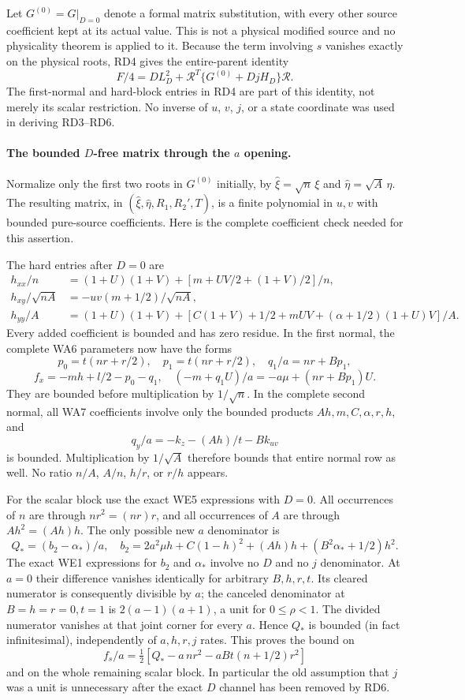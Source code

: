 Let $G^{(0)}=G|_{D=0}$ denote a formal matrix substitution, with every
other source coefficient kept at its actual value. This is not a
physical modified source and no physicality theorem is applied to it.
Because the term involving $s$ vanishes exactly on the physical roots,
RD4 gives the entire-parent identity
\[
 F/4=D L_D^2+\mathcal R^T\{G^{(0)}+DjH_D\}\mathcal R.
                                                               \tag{RD6}
\]
The first-normal and hard-block entries in RD4 are part of this identity,
not merely its scalar restriction. No inverse of $u$, $v$, $j$, or a
state coordinate was used in deriving RD3--RD6.

\paragraph{The bounded $D$-free matrix through the $a$ opening.}
Normalize only the first two roots in $G^{(0)}$ initially, by
$\widehat\xi=\sqrt n\,\xi$ and $\widehat\eta=\sqrt A\,\eta$.
The resulting matrix, in
$(\widehat\xi,\widehat\eta,R_1,R_2',T)$, is a finite polynomial in
$u,v$ with bounded pure-source coefficients. Here is the complete
coefficient check needed for this assertion.

The hard entries after $D=0$ are
\begin{align*}
 h_{xx}/n&=(1+U)(1+V)+[m+UV/2+(1+V)/2]/n,\\
 h_{xy}/\sqrt{nA}&=-uv(m+1/2)/\sqrt{nA},\\
 h_{yy}/A&=(1+U)(1+V)
       +[C(1+V)+1/2+mUV+(\alpha+1/2)(1+U)V]/A.
\end{align*}
Every added coefficient is bounded and has zero residue.
In the first normal, the complete WA6 parameters now have the forms
\[
 p_0=t(nr+r/2),\quad p_1=t(nr+r/2),\quad
 q_1/a=nr+Bp_1,
\]
\[
 f_x=-mh+l/2-p_0-q_1,
 \quad (-m+q_1U)/a=-a\mu+(nr+Bp_1)U.
\]
They are bounded before multiplication by $1/\sqrt n$.
In the complete second normal, all WA7 coefficients involve only
the bounded products $Ah,m,C,\alpha,r,h$, and
\[
 q_y/a=-k_z-(Ah)/t-Bk_{uv}
\]
is bounded. Multiplication by $1/\sqrt A$ therefore bounds that
entire normal row as well. No ratio $n/A$, $A/n$, $h/r$, or $r/h$
appears.

For the scalar block use the exact WE5 expressions with $D=0$.
All occurrences of $n$ are through $nr^2=(nr)r$, and all occurrences
of $A$ are through $Ah^2=(Ah)h$. The only possible new $a$ denominator
is
\[
 Q_*=(b_2-\alpha_*)/a,\quad
 b_2=2a^2\mu h+C(1-h)^2+(Ah)h+(B^2\alpha_*+1/2)h^2. \tag{RD7}
\]
The exact WE1 expressions for $b_2$ and $\alpha_*$ involve no $D$
and no $j$ denominator. At $a=0$ their difference vanishes identically
for arbitrary $B,h,r,t$. Its cleared numerator is consequently
divisible by $a$; the canceled denominator at $B=h=r=0,t=1$ is
$2(a-1)(a+1)$, a unit for $0\le\rho<1$. The divided numerator
vanishes at that joint corner for every $a$. Hence $Q_*$ is bounded
(in fact infinitesimal), independently of $a,h,r,j$ rates.
This proves the bound on
\[
 f_s/a=\tfrac12[Q_*-a\,nr^2-aBt(n+1/2)r^2]
\]
and on the whole remaining scalar block. In particular the old
assumption that $j$ was a unit is unnecessary after the exact $D$
channel has been removed by RD6.

